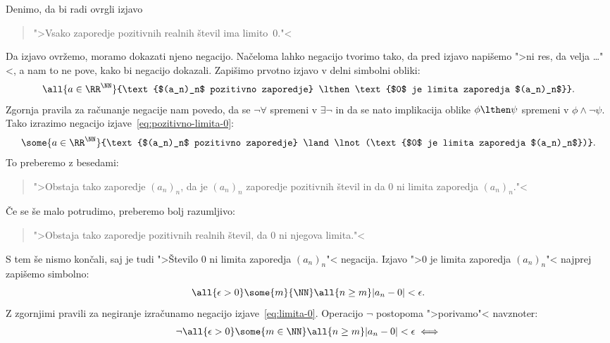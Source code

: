 \begin{zgled}
  Denimo, da bi radi ovrgli izjavo
  \begin{quote}
    ">Vsako zaporedje pozitivnih realnih števil ima limito~$0$."<
  \end{quote}
  Da izjavo ovržemo, moramo dokazati njeno negacijo. Načeloma lahko
  negacijo tvorimo tako, da pred izjavo napišemo ">ni res, da velja
  \dots"<, a nam to ne pove, kako bi negacijo dokazali. Zapišimo
  prvotno izjavo v delni simbolni obliki:
  \begin{equation}
    \label{eq:pozitivno-limita-0}
    \all{a \in \RR^{\NN}}{\text{$(a_n)_n$ pozitivno zaporedje}
      \lthen \text{$0$ je limita zaporedja $(a_n)_n$}}.
  \end{equation}
  Zgornja pravila za računanje negacije nam povedo, da se
  $\lnot\forall$ spremeni v $\exists\lnot$ in da se nato implikacija
  oblike $\phi \lthen \psi$ spremeni v $\phi \land \lnot\psi$. Tako
  izrazimo negacijo izjave~\eqref{eq:pozitivno-limita-0}:
  \begin{equation*}
    \some{a \in \RR^{\NN}}{\text{$(a_n)_n$ pozitivno zaporedje}
      \land \lnot (\text{$0$ je limita zaporedja $(a_n)_n$})}.
  \end{equation*}
  To preberemo z besedami:
  \begin{quote}
    ">Obstaja tako zaporedje $(a_n)_n$, da je $(a_n)_n$ zaporedje
    pozitivnih števil in da $0$ ni limita zaporedja $(a_n)_n$."<
  \end{quote}
  Če se še malo potrudimo, preberemo bolj razumljivo:
  \begin{quote}
    ">Obstaja tako zaporedje pozitivnih realnih števil, da $0$ ni
    njegova limita."<
  \end{quote}
  S tem še nismo končali, saj je tudi ">Število $0$ ni limita
  zaporedja $(a_n)_n$"< negacija. Izjavo ">$0$ je limita zaporedja
  $(a_n)_n$"< najprej zapišemo simbolno:
  \begin{equation}
    \label{eq:limita-0}
    \all{\epsilon > 0}
      \some{m}{\NN}
        \all{n \geq m}
          |a_n - 0| < \epsilon.
  \end{equation}
  Z zgornjimi pravili za negiranje izračunamo negacijo
  izjave~\eqref{eq:limita-0}. Operacijo $\lnot$ postopoma ">porivamo"<
  navznoter:
  \begin{align*}
    \lnot \all{\epsilon > 0} \some{m \in \NN} \all{n \geq m} |a_n
          - 0| < \epsilon & \iff
    \\

\end{align*}
\end{zgled}
